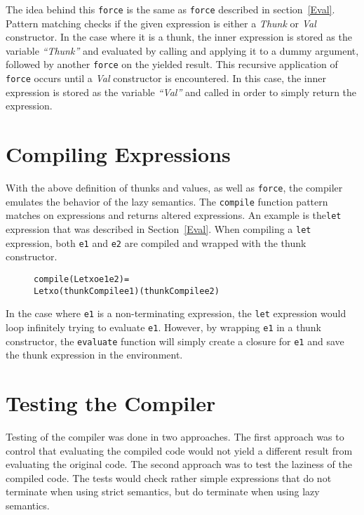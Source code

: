 \noindent The idea behind this \texttt{force} is the same as \texttt{force} described
in section~\ref{Eval}. Pattern matching checks if the given expression is either
a \textit{Thunk} or \textit{Val} constructor. In the case where it is a thunk,
the inner expression is stored as the variable \textit{``Thunk''} and evaluated
by calling and applying it to a dummy argument, followed by another
\texttt{force} on the yielded result. This recursive application of
\texttt{force} occurs until a \textit{Val} constructor is encountered. In this
case, the inner expression is stored as the variable \textit{``Val''} and called
in order to simply return the expression.


\section{Compiling Expressions}
With the above definition of thunks and values, as well as \texttt{force}, the
compiler emulates the behavior of the lazy semantics. The \texttt{compile}
function pattern matches on expressions and returns altered expressions.
An example is the\texttt{let} expression that was described in
Section~\ref{Eval}.
When compiling a \texttt{let} expression, both \texttt{e1} and \texttt{e2} are
compiled and wrapped with the thunk constructor.

\begin{figure}[!ht]
\begin{alltt}
compile (Let xo e1 e2) =
  Let xo (thunkCompile e1) (thunkCompile e2)
\end{alltt}
\end{figure}

\noindent In the case where \texttt{e1} is a non-terminating expression,
the \texttt{let} expression would loop infinitely trying to evaluate
\texttt{e1}. However, by wrapping \texttt{e1} in a thunk constructor, the
\texttt{evaluate} function will simply create a closure for \texttt{e1} and save
the thunk expression in the environment.

\section{Testing the Compiler}

Testing of the compiler was done in two approaches. The first approach was to
control that evaluating the compiled code would not yield a different result
from evaluating the original code. The second approach was to test the laziness
of the compiled code. The tests would check rather simple expressions that do
not terminate when using strict semantics, but do terminate when using lazy
semantics.



